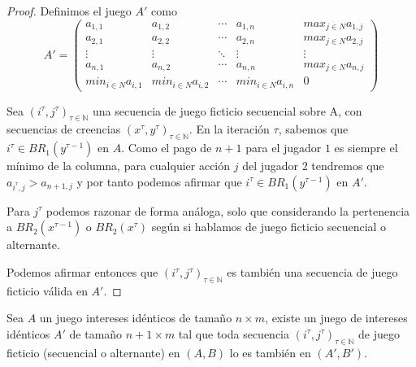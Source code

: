 \begin{proof}
    Definimos el juego $A'$ como
    \begin{equation*}
        A' =
        \begin{pmatrix}
        a_{1,1} & a_{1,2} & \cdots & a_{1,n} & max_{j \in N} a_{1,j}    \\
        a_{2,1} & a_{2,2} & \cdots & a_{2,n} & max_{j \in N} a_{2,j}    \\
        \vdots  & \vdots  & \ddots & \vdots  & \vdots                   \\
        a_{n,1} & a_{n,2} & \cdots & a_{n,n} & max_{j \in N} a_{n,j}    \\
        min_{i \in N} a_{i,1} & min_{i \in N} a_{i,2} & \cdots & min_{i \in N} a_{i,n}        & 0
        \end{pmatrix}
    \end{equation*} 

    Sea $(i^\tau, j^\tau)_{\tau \in \mathbb{N}}$ una secuencia de juego ficticio secuencial sobre A, con secuencias de creencias $(x^\tau, y^\tau)_{\tau \in \mathbb{N}}$. En la iteración $\tau$, sabemos que $i^\tau \in BR_1(y^{\tau - 1})$ en $A$. Como el pago de $n+1$ para el jugador $1$ es siempre el mínimo de la columna, para cualquier acción $j$ del jugador $2$ tendremos que $a_{i^\tau, j} > a_{n+1,j}$ y por tanto podemos afirmar que $i^\tau \in BR_1(y^{\tau - 1})$ en $A'$.

    Para $j^\tau$ podemos razonar de forma análoga, solo que considerando la pertenencia a $BR_2(x^{\tau - 1})$ o $BR_2(x^\tau)$ según si hablamos de juego ficticio secuencial o alternante.

    Podemos afirmar entonces que $(i^\tau, j^\tau)_{\tau \in \mathbb{N}}$ es también una secuencia de juego ficticio  válida en $A'$.
\end{proof}

\begin{lemma}
    Sea $A$ un juego intereses idénticos de tamaño $n \times m$, existe un juego de intereses idénticos $A'$ de tamaño $n+1 \times m$ tal que toda secuencia $(i^\tau, j^\tau)_{\tau \in \mathbb{N}}$ de juego ficticio (secuencial o alternante) en $(A, B)$ lo es también en $(A', B')$.
\end{lemma}

